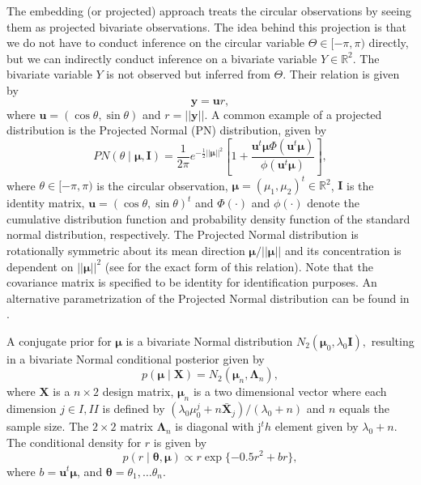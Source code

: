 The embedding (or projected) approach treats the circular observations
by seeing them as projected bivariate observations. The idea behind this
projection is that we do not have to conduct inference on the circular
variable \(\Theta \in [-\pi, \pi)\) directly, but we can indirectly
conduct inference on a bivariate variable \(Y \in \mathbb{R}^2\). The
bivariate variable \(Y\) is not observed but inferred from \(\Theta\).
Their relation is given by
\begin{equation} \boldsymbol{y} = \boldsymbol{u}r, \end{equation} where
\(\boldsymbol{u} = (\cos \theta, \sin \theta)\) and
\(r = \vert\vert \boldsymbol{y} \vert\vert\). A common example of a
projected distribution is the Projected Normal (PN) distribution, given
by \begin{equation}
PN(\theta \mid \boldsymbol{\mu}, \boldsymbol{I})  = \frac{1}{2 \pi} e^{-\frac{1}{2}\vert \vert \boldsymbol\mu \vert \vert ^ 2} \left[1+\frac{\boldsymbol{u}^t\boldsymbol\mu\Phi(\boldsymbol{u}^t\boldsymbol\mu)}{\phi(\boldsymbol{u}^t\boldsymbol\mu)}\right],
\label{eq:PNdistribution}
\end{equation} where \(\theta \in [-\pi, \pi)\) is the circular
observation,
\(\boldsymbol{\mu} = (\mu_{1}, \mu_{2})^{t} \in \mathbb{R}^2\),
\(\boldsymbol{I}\) is the identity matrix,
\(\boldsymbol{u} = (\cos \theta, \sin \theta)^{t}\) and \(\Phi(\cdot)\)
and \(\phi(\cdot)\) denote the cumulative distribution function and
probability density function of the standard normal distribution,
respectively. The Projected Normal distribution is rotationally
symmetric about its mean direction
\(\boldsymbol{\mu}/\vert\vert\boldsymbol{\mu}\vert\vert\) and its
concentration is dependent on \(\vert\vert\boldsymbol{\mu}\vert\vert^2\)
(see \citet{Kendall1974} for the exact form of this relation). Note that
the covariance matrix is specified to be identity for identification
purposes. An alternative parametrization of the Projected Normal
distribution can be found in \citet{wang2012directional}.

A conjugate prior for \(\boldsymbol{\mu}\) is a bivariate Normal
distribution \(N_2(\boldsymbol{\mu}_0, \lambda_0\boldsymbol{I}),\)
resulting in a bivariate Normal conditional posterior given by
\citep{Nunez-Antonio2005} \begin{equation}
p(\boldsymbol{\mu} \mid \boldsymbol{X}) = N_2(\boldsymbol{\mu}_n, \boldsymbol{\Lambda}_n),
\end{equation} where \(\boldsymbol{X}\) is a \(n\times2\) design matrix,
\(\boldsymbol{\mu}_n\) is a two dimensional vector where each dimension
\(j \in {I,II}\) is defined by
\((\lambda_0\mu_0^j + n\bar{\boldsymbol{X}}_{j})/(\lambda_0 + n)\) and
\(n\) equals the sample size. The \(2\times2\) matrix
\(\boldsymbol{\Lambda}_n\) is diagonal with j\(^th\) element given by
\(\lambda_0 + n\). The conditional density for \(r\) is given by
\begin{equation}
p(r \mid \boldsymbol{\theta}, \boldsymbol{\mu}) \propto r \exp\{-0.5r^2 + br\},
\end{equation} where \(b = \boldsymbol{u}^t\boldsymbol{\mu}\), and
\(\boldsymbol{\theta} = \theta_1, \dots \theta_n\).

